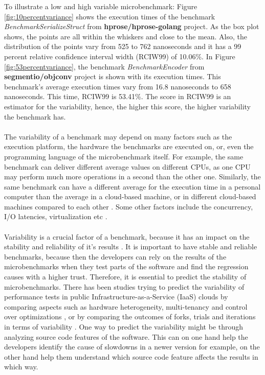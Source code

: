 \documentclass{seal_thesis}
\begin{document}
\noindent To illustrate a low and high variable microbenchmark: Figure \ref{fig:10percentvariance} shows the execution times of the benchmark \textit{BenchmarkSerializeStruct} from \textbf{hprose/hprose-golang} project\cite{hprose/hprose-golang}. As the box plot shows, the points are all within the whiskers and close to the mean. Also, the distribution of the points vary from 525 to 762 nanoseconds and it has a 99 percent relative confidence interval width (RCIW99) of 10.06\%. In Figure \ref{fig:53percentvariance}, the benchmark \textit{BenchmarkEncoder} from \textbf{segmentio/objconv} project \cite{segmentio/objconv} is shown with its execution times. This benchmark's average execution times vary from 16.8 nanoseconds to 658 nanoseconds. This time, RCIW99 is 53.41\%. The  score in RCIW99 is an estimator for the variability, hence, the higher this score, the higher variability the benchmark has.\\
\\
The variability of a benchmark may depend on many factors such as the execution platform, the hardware the benchmarks are executed on, or, even the programming language of the microbenchmark itself\cite{laaber2018performance}. For example, the same benchmark can deliver different average values on different CPUs, as one CPU may perform much more operations in a second than the other one. Similarly, the same benchmark can have a different average for the execution time in a personal computer than the average in a cloud-based machine, or in different cloud-based machines compared to each other \cite{laaber2019software}. Some other factors include the concurrency, I/O latencies, virtualization etc \cite{laaber2019software}. \\
\\
Variability is a crucial factor of a benchmark, because it has an impact on the stability and reliability of it's results \cite{Laaber:2018:EOS:3196398.3196407}. It is important to have stable and reliable benchmarks, because then the developers can rely on the results of the microbenchmarks when they test parts of the software and find the regression causes with a higher trust. Therefore, it is essential to predict the stability of microbenchmarks. There has been studies trying to predict the variability of performance tests in public Infrastructure-as-a-Service (IaaS) clouds by comparing aspects such as hardware heterogeneity, multi-tenancy and control over optimizations \cite{Leitner:2016:PCS:2926746.2885497}, or by comparing the outcomes of forks, trials and iterations in terms of variability \cite{laaber2019software}. One way to predict the variability might be through analyzing source code features of the software. This can on one hand help the developers identify the cause of slowdowns in a newer version for example, on the other hand help them understand which source code feature affects the results in which way.\\
\end{document}
